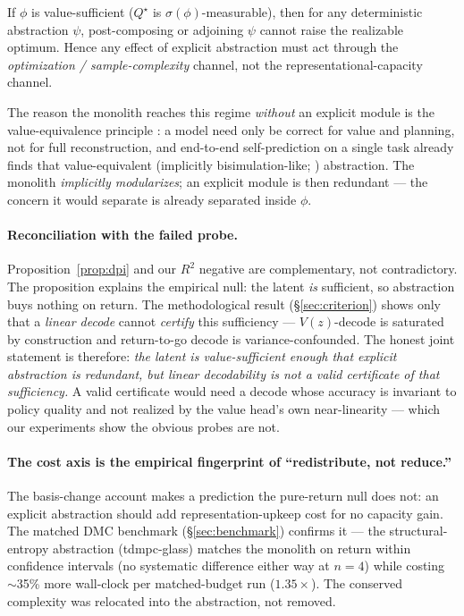 \begin{proposition}
\label{prop:dpi}
If $\phi$ is value-sufficient ($Q^\star$ is $\sigma(\phi)$-measurable), then for any
deterministic abstraction $\psi$, post-composing or adjoining $\psi$ cannot raise the realizable
optimum. Hence any effect of explicit abstraction must act through the \emph{optimization /
sample-complexity} channel, not the representational-capacity channel.
\end{proposition}

The reason the monolith reaches this regime \emph{without} an explicit module is the
value-equivalence principle \citep{grimm2020value}: a model need only be correct for value and
planning, not for full reconstruction, and end-to-end self-prediction on a single task already
finds that value-equivalent (implicitly bisimulation-like; \citealp{ferns2004,castro2020,gelada2019})
abstraction. The monolith \emph{implicitly modularizes}; an explicit module is then redundant ---
the concern it would separate is already separated inside $\phi$.

\paragraph{Reconciliation with the failed probe.}
Proposition~\ref{prop:dpi} and our $R^2$ negative are complementary, not contradictory. The
proposition explains the empirical null: the latent \emph{is} sufficient, so abstraction buys
nothing on return. The methodological result (\S\ref{sec:criterion}) shows only that a
\emph{linear decode} cannot \emph{certify} this sufficiency --- $V(z)$-decode is saturated by
construction and return-to-go decode is variance-confounded. The honest joint statement is
therefore: \emph{the latent is value-sufficient enough that explicit abstraction is redundant,
but linear decodability is not a valid certificate of that sufficiency.} A valid certificate
would need a decode whose accuracy is invariant to policy quality and not realized by the value
head's own near-linearity --- which our experiments show the obvious probes are not.

\paragraph{The cost axis is the empirical fingerprint of ``redistribute, not reduce.''}
The basis-change account makes a prediction the pure-return null does not: an explicit
abstraction should add representation-upkeep cost for no capacity gain. The matched DMC
benchmark (\S\ref{sec:benchmark}) confirms it --- the structural-entropy abstraction
(tdmpc-glass) matches the monolith on return within confidence intervals (no systematic
difference either way at $n{=}4$) while costing $\sim$35\% more wall-clock per matched-budget run
($1.35\times$). The conserved complexity was relocated into the abstraction, not removed.

